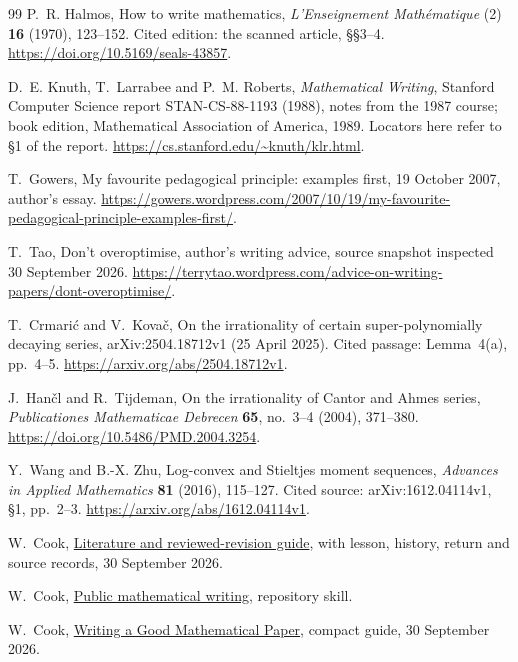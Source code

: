 \begin{thebibliography}{99}
P.~R. Halmos, How to write mathematics, \emph{L'Enseignement Math\'ematique}
(2) \textbf{16} (1970), 123--152. Cited edition: the scanned article,
\S\S3--4. \url{https://doi.org/10.5169/seals-43857}.

D.~E. Knuth, T.~Larrabee and P.~M. Roberts, \emph{Mathematical Writing},
Stanford Computer Science report STAN-CS-88-1193 (1988), notes from the
1987 course; book edition, Mathematical Association of America, 1989.
Locators here refer to \S1 of the report.
\url{https://cs.stanford.edu/~knuth/klr.html}.

T.~Gowers, My favourite pedagogical principle: examples first,
19 October 2007, author's essay.
\url{https://gowers.wordpress.com/2007/10/19/my-favourite-pedagogical-principle-examples-first/}.

T.~Tao, Don't overoptimise, author's writing advice,
source snapshot inspected 30 September 2026.
\url{https://terrytao.wordpress.com/advice-on-writing-papers/dont-overoptimise/}.

T.~Crmari\'c and V.~Kova\v{c}, On the irrationality of certain
super-polynomially decaying series, arXiv:2504.18712v1 (25 April 2025).
Cited passage: Lemma~4(a), pp.~4--5.
\url{https://arxiv.org/abs/2504.18712v1}.

J.~Han\v{c}l and R.~Tijdeman, On the irrationality of Cantor and Ahmes series,
\emph{Publicationes Mathematicae Debrecen} \textbf{65}, no.~3--4
(2004), 371--380. \url{https://doi.org/10.5486/PMD.2004.3254}.

Y.~Wang and B.-X. Zhu, Log-convex and Stieltjes moment sequences,
\emph{Advances in Applied Mathematics} \textbf{81} (2016), 115--127.
Cited source: arXiv:1612.04114v1, \S1, pp.~2--3.
\url{https://arxiv.org/abs/1612.04114v1}.

W.~Cook, \href{https://github.com/wcook04/plectis-erdos/tree/main/docs/papers/exposition-method}{Literature and reviewed-revision guide},
with lesson, history, return and source records, 30 September 2026.

W.~Cook, \href{https://github.com/wcook04/plectis-erdos/blob/main/skills/public-mathematical-writing/SKILL.md}{Public mathematical writing}, repository skill.

W.~Cook, \href{https://github.com/wcook04/plectis-erdos/blob/main/paper/exposition/writing-a-good-mathematical-paper.pdf}{Writing a Good Mathematical Paper},
compact guide, 30 September 2026.


\end{thebibliography}
